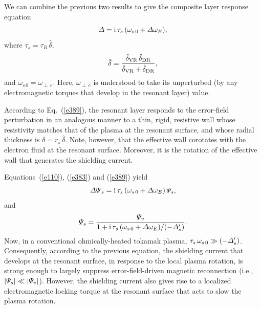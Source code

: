 \documentclass[12pt,prb,aps]{revtex4-1}
\begin{document}
We can combine the previous two results to give the composite layer response equation
\begin{equation}\label{e389}
{\mit\Delta} = {\rm i}\,\tau_s\,(\omega_{s\,0}+ {\mit\Delta}\omega_E),
\end{equation}
where $\tau_s=\tau_R\,\hat{\delta}$, 
\begin{equation}
\hat{\delta} = \frac{\hat{\delta}_{\rm VR}\,\hat{\delta}_{\rm DR}}{\hat{\delta}_{\rm VR} + \hat{\delta}_{\rm DR}},
\end{equation}
and 
$\omega_{s\,0}= \omega_{\perp\,e}$.
Here, $\omega_{\perp\,e}$ is understood to take its unperturbed (by any electromagnetic torques that
develop in the resonant layer) value. 

According to Eq.~(\ref{e389}), the resonant layer responds to the error-field
perturbation in an analogous manner to a thin, rigid, resistive wall whose resistivity matches that of the plasma at the
resonant surface, and whose radial thickness is $\delta=r_s\,\hat{\delta}$. Note, however, that the effective wall corotates with the
electron fluid at the resonant surface. Moreover, it is the rotation of the effective wall that generates the shielding current. 

Equations~(\ref{e110}), (\ref{e383}) and (\ref{e389}) yield
\begin{equation}\label{e391}
{\mit\Delta\Psi}_s ={\rm i}\,\tau_s\,(\omega_{s\,0}+{\mit\Delta}\omega_E)\,{\mit\Psi}_s,
\end{equation}
and 
\begin{equation}\label{e392}
{\mit\Psi}_s=\frac{{\mit\Psi}_v}{1+ {\rm i}\,\tau_s\,(\omega_{s\,0}+ {\mit\Delta}\omega_E)/(-{\mit\Delta}_s')}.
\end{equation}
Now, in a conventional ohmically-heated tokamak plasma, $\tau_s\,\omega_{s\,0}\gg (-{\mit\Delta}_s')$. Consequently, according to the previous equation, the
shielding current that develops at the resonant surface, in response to the local plasma rotation, is strong enough to largely
suppress error-field-driven magnetic reconnection (i.e., $|{\mit\Psi}_s|\ll |{\mit\Psi}_v|$). However, the shielding current also gives rise to a localized electromagnetic
locking torque at the resonant surface  that acts to slow the plasma rotation. 
\end{document}
